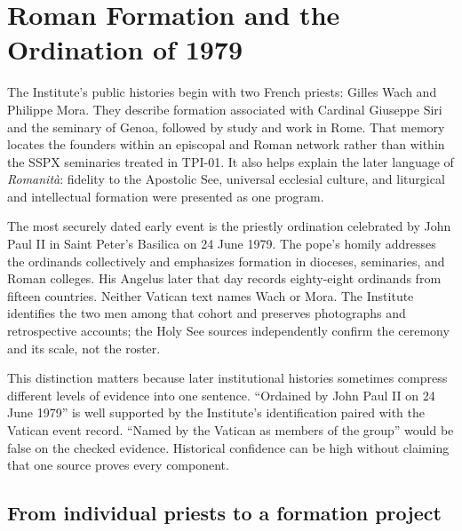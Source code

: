 \section{Roman Formation and the Ordination of 1979}

The Institute's public histories begin with two French priests: Gilles Wach and Philippe Mora. They describe formation associated with Cardinal Giuseppe Siri and the seminary of Genoa, followed by study and work in Rome. That memory locates the founders within an episcopal and Roman network rather than within the SSPX seminaries treated in TPI-01. It also helps explain the later language of \emph{Romanità}: fidelity to the Apostolic See, universal ecclesial culture, and liturgical and intellectual formation were presented as one program.

The most securely dated early event is the priestly ordination celebrated by John Paul II in Saint Peter's Basilica on 24 June 1979. The pope's homily addresses the ordinands collectively and emphasizes formation in dioceses, seminaries, and Roman colleges. His Angelus later that day records eighty-eight ordinands from fifteen countries. Neither Vatican text names Wach or Mora. The Institute identifies the two men among that cohort and preserves photographs and retrospective accounts; the Holy See sources independently confirm the ceremony and its scale, not the roster.

This distinction matters because later institutional histories sometimes compress different levels of evidence into one sentence. ``Ordained by John Paul II on 24 June 1979'' is well supported by the Institute's identification paired with the Vatican event record. ``Named by the Vatican as members of the group'' would be false on the checked evidence. Historical confidence can be high without claiming that one source proves every component.


\subsection{From individual priests to a formation project}

